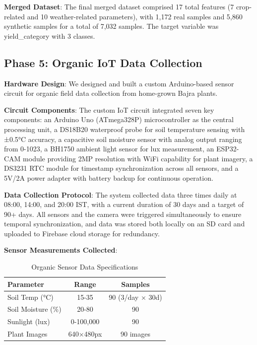 \documentclass[10pt,twocolumn]{article}
\begin{document}
\textbf{Merged Dataset}: The final merged dataset comprised 17 total features (7 crop-related and 10 weather-related parameters), with 1,172 real samples and 5,860 synthetic samples for a total of 7,032 samples. The target variable was yield\_category with 3 classes.

\subsection{Phase 5: Organic IoT Data Collection}

\textbf{Hardware Design}:
We designed and built a custom Arduino-based sensor circuit for organic field data collection from home-grown Bajra plants.

\textbf{Circuit Components}: The custom IoT circuit integrated seven key components: an Arduino Uno (ATmega328P) microcontroller as the central processing unit, a DS18B20 waterproof probe for soil temperature sensing with ±0.5°C accuracy, a capacitive soil moisture sensor with analog output ranging from 0-1023, a BH1750 ambient light sensor for lux measurement, an ESP32-CAM module providing 2MP resolution with WiFi capability for plant imagery, a DS3231 RTC module for timestamp synchronization across all sensors, and a 5V/2A power adapter with battery backup for continuous operation.

\textbf{Data Collection Protocol}: The system collected data three times daily at 08:00, 14:00, and 20:00 IST, with a current duration of 30 days and a target of 90+ days. All sensors and the camera were triggered simultaneously to ensure temporal synchronization, and data was stored both locally on an SD card and uploaded to Firebase cloud storage for redundancy.

\textbf{Sensor Measurements Collected}:
\begin{table}[H]
\centering
\caption{Organic Sensor Data Specifications}
\begin{tabular}{lcc}
\toprule
\textbf{Parameter} & \textbf{Range} & \textbf{Samples} \\
\midrule
Soil Temp (°C)     & 15-35         & 90 (3/day × 30d) \\
Soil Moisture (\%) & 20-80         & 90 \\
Sunlight (lux)     & 0-100,000     & 90 \\
Plant Images       & 640×480px     & 90 images \\
\bottomrule
\end{tabular}
\end{table}
\end{document}
